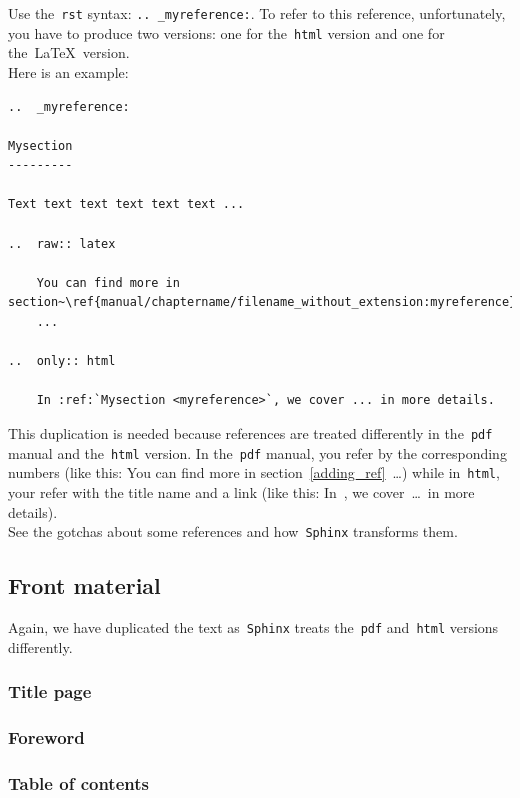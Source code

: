 \documentclass[a4paper,10pt]{article}
\newcommand{\code}[1]{\texttt{#1}}
\begin{document}
Use the~\code{rst} syntax: \code{.. \_myreference:}. To refer to this reference, unfortunately, you have to produce two versions: one for the~\code{html} version and one for the~\LaTeX~version.\\

Here is an example:\\

\begin{verbatim}
..  _myreference:

Mysection
---------

Text text text text text text ...

..  raw:: latex

    You can find more in section~\ref{manual/chaptername/filename_without_extension:myreference}
    ...

..  only:: html

    In :ref:`Mysection <myreference>`, we cover ... in more details.
\end{verbatim}


This duplication is needed because references are treated differently in the~\code{pdf} manual and the~\code{html} version. In the~\code{pdf} manual, you refer by the corresponding numbers (like this: You can find more in section~\ref{adding_ref}~\ldots) while in~\code{html}, your refer with the title name and a link (like this: In~, we cover~\ldots\ in more details).\\

See the gotchas about some references and how~\code{Sphinx} transforms them.

\subsection{Front material}

Again, we have duplicated the text as~\code{Sphinx} treats the~\code{pdf} and~\code{html} versions differently.

\subsubsection{Title page}

\subsubsection{Foreword}

\subsubsection{Table of contents}
\end{document}
